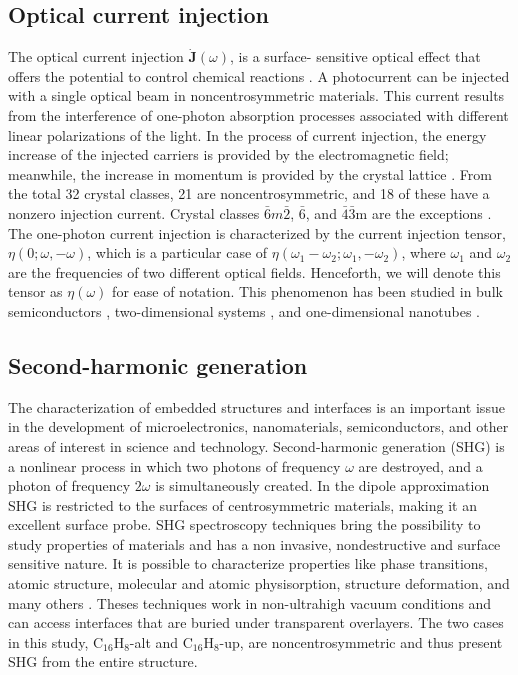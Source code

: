 \documentclass[pss]{wiley2sp} %
\begin{document}
\subsection{Optical current injection}

The optical current injection $\mathbf{\dot{J}}(\omega)$, is a surface-
sensitive optical effect that offers the potential to control chemical
reactions \cite{bhatPRB05,hachePRL97}. A photocurrent can be injected with a
single optical beam in noncentrosymmetric materials. This current results from
the interference of one-photon absorption processes associated with different
linear polarizations of the light. In the process of current injection, the
energy increase of the injected carriers is provided by the electromagnetic
field; meanwhile, the increase in momentum is provided by the crystal lattice
\cite{arzatePRB14}. From the total 32 crystal classes, 21 are
noncentrosymmetric, and 18 of these have a nonzero injection current. Crystal
classes $\bar{6}m\bar{2}$, $\bar{6}$, and $\bar{4}$$\bar{3}$m are the
exceptions \cite{sipePRB00}. The one-photon current injection is characterized
by the current injection tensor, $\eta(0;\omega,−\omega)$, which is a
particular case of $\eta(\omega_{1}-\omega_{2};\omega_{1},-\omega_{2})$, where
$\omega_{1}$ and $\omega_{2}$ are the frequencies of two different optical
fields. Henceforth, we will denote this tensor as $\eta(\omega)$ for ease of
notation. This phenomenon has been studied in bulk semiconductors
\cite{hachePRL97,sipePRB00}, two-dimensional systems
\cite{melePRB00,cabellosPRB11}, and one-dimensional nanotubes
\cite{melePRB00}.


\subsection{Second-harmonic generation}

The characterization of embedded structures and interfaces is an important
issue in the development of microelectronics, nanomaterials, semiconductors,
and other areas of interest in science and technology. Second-harmonic
generation (SHG) is a nonlinear process in which two photons of frequency
$\omega$ are destroyed, and a photon of frequency $2\omega$ is simultaneously
created. In the dipole approximation SHG is restricted to the surfaces of
centrosymmetric materials, making it an excellent surface probe. SHG
spectroscopy techniques bring the possibility to study properties of materials
and has a non invasive, nondestructive and surface sensitive nature. It is
possible to characterize properties like phase transitions, atomic structure,
molecular and atomic physisorption, structure deformation, and many others
\cite{dadapPRB97,godefroyAPL96,salazarPRB14,mendozaPRL98}. Theses techniques
work in non-ultrahigh vacuum conditions and can access interfaces that are
buried under transparent overlayers. The two cases in this study,
C$_{16}$H$_{8}$-alt and C$_{16}$H$_{8}$-up, are noncentrosymmetric and thus
present SHG from the entire structure.
\end{document}
